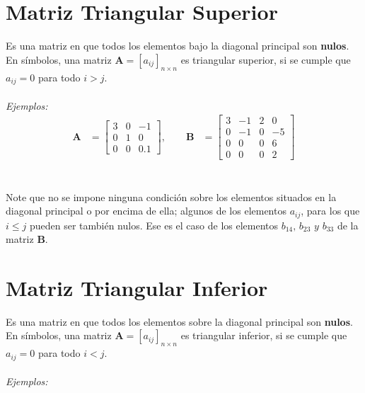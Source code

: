 \documentclass[a4paper,12pt]{report} %
\begin{document}
\section{Matriz Triangular Superior}
Es una matriz en que todos los elementos bajo la diagonal principal son \textbf{nulos}. En símbolos, una matriz \(\mathbf{A} = \left[\mathit{a_{ij}}\right]_\mathit{n\times n}\) es triangular superior, si se cumple que \(\mathit{a_{ij}}=0\) para todo \(\mathit{i>j}\).
\\ \\
\textit{Ejemplos:} \\ 

\[
\begin{aligned}
\mathbf{A} &= \begin{bmatrix}
    3  & 0 & -1 \\
    0 & 1 & 0 \\
    0 & 0 & \text{0.1}
\end{bmatrix},
\qquad
\mathbf{B} &= \begin{bmatrix}
    3 & -1 & 2 & 0\\
    0 & -1 & 0 & -5\\
    0 & 0 & 0 & 6\\
    0 & 0 & 0 & 2
\end{bmatrix}
\end{aligned}
\]\\ \\
Note que no se impone ninguna condición sobre los elementos situados en la diagonal principal o por encima de ella; algunos de los elementos \(\mathit{a_{ij}}\), para los que \(\mathit{i\leq j}\) pueden ser también nulos. Ese es el caso de los elementos \(\mathit{b_{14}\text{, }b_{23}\text{ y }b_{33}}\) de la matriz \textbf{B}.
\\

\section{Matriz Triangular Inferior}
Es una matriz en que todos los elementos sobre la diagonal principal son \textbf{nulos}. En símbolos, una matriz \(\mathbf{A} = \left[\mathit{a_{ij}}\right]_\mathit{n\times n}\) es triangular inferior, si se cumple que \(\mathit{a_{ij}}=0\) para todo \(\mathit{i<j}\).
\\ \\
\textit{Ejemplos:} \\ 
\end{document}
